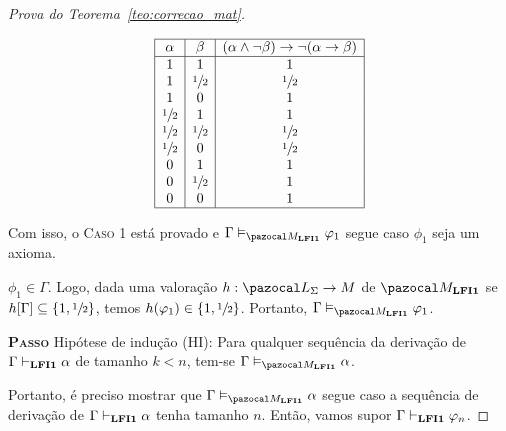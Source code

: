 \begin{proof}[Prova do Teorema~\ref{teo:correcao_mat}]
\begin{provaporcasos}
\begin{provaporsubcasos}
                \begin{center}
                    \[
                        \begin{array}{|c|c|c|}%
                            \hline
                            \alpha      & \beta & (\alpha \land \neg \beta) \to \neg(\alpha \to \beta) \\
                            \hline%
                            1 & 1 & 1\\
                            1 & \meio{} & \meio{}\\
                            1 & 0 & 1\\
                            \meio{} & 1 & 1\\
                            \meio{} & \meio{} &\meio{}\\ 
                            \meio{} & 0 & \meio{}\\
                            0 & 1 & 1\\
                            0 & \meio{} & 1\\
                            0 & 0 & 1\\
                            \hline
                        \end{array}
                    \]
                \end{center}
                
            \end{provaporsubcasos}

            Com isso, o \textsc{Caso 1} está provado e $\Gamma \conmat \phi_{1}$ segue caso $\phi_{1}$ seja um axioma.

            \casodeprova{} $\phi_{1} \in \Gamma$. Logo, dada uma valoração $h : \ling{} \to M$ de $\mat{}$ se $h[\Gamma] \subseteq \{1, \sfrac{1}{2}{}\}$, temos $h(\varphi_{1}) \in \{1, \sfrac{1}{2}{}\}$. Portanto, $\Gamma \conmat \phi_{1}$.

        \end{provaporcasos}

         \noindent \textbf{\textsc{Passo}} Hipótese de indução (HI): Para qualquer sequência da derivação de $\Gamma \vdash_{{\normalfont\textbf{LFI1}}{}} \alpha$ de tamanho $k < n$, tem-se $\Gamma \conmat \alpha$. 
         
         Portanto, é preciso mostrar que $\Gamma \conmat \alpha$ segue caso a sequência de derivação de $\Gamma \vdash_{{\normalfont\textbf{LFI1}}{}} \alpha$ tenha tamanho $n$. Então, vamos supor $\Gamma \vdash_{{\normalfont\textbf{LFI1}}{}} \varphi_{n}$.
         

\end{proof}
